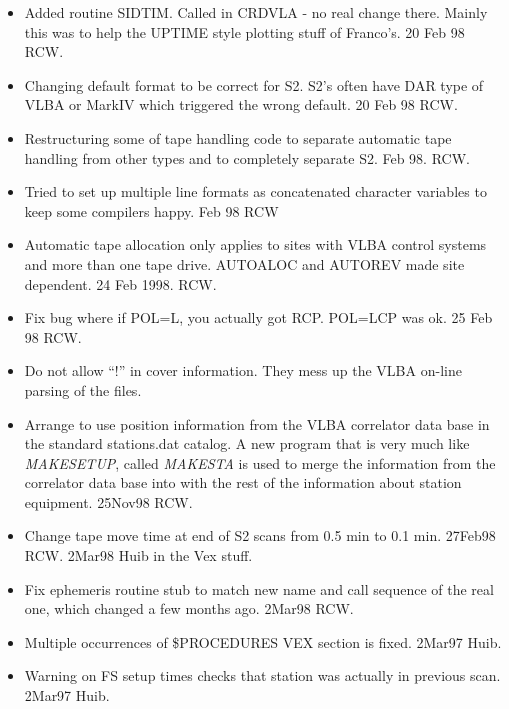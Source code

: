 \documentclass{report}
\begin{document}
\begin{itemize}
\item Added routine SIDTIM.  Called in CRDVLA - no real change there.
      Mainly this was to help the UPTIME style plotting stuff of
      Franco's.  20 Feb 98  RCW.

\item Changing default format to be correct for S2.  S2's often have
      DAR type of VLBA or MarkIV which triggered the wrong default.
      20 Feb 98  RCW.

\item Restructuring some of tape handling code to separate automatic
      tape handling from other types and to completely separate S2.
      Feb 98.  RCW.

\item Tried to set up multiple line formats as concatenated character
      variables to keep some compilers happy.  Feb 98 RCW

\item Automatic tape allocation only applies to sites with VLBA
      control systems and more than one tape drive.  AUTOALOC and
      AUTOREV made site dependent.  24 Feb 1998. RCW.

\item Fix bug where if POL=L, you actually got RCP.  POL=LCP was ok.
      25 Feb 98  RCW.

\item Do not allow ``!'' in cover information.  They mess up the
      VLBA on-line parsing of the files.

\item Arrange to use position information from the VLBA correlator
      data base in the standard stations.dat catalog.  A new program
      that is very much like {\sl MAKESETUP}, called {\sl MAKESTA}
      is used to merge the information from the correlator data
      base into with the rest of the information about station
      equipment.  25Nov98  RCW.

\item Change tape move time at end of S2 scans from 0.5 min to 0.1 min.
      27Feb98 RCW.  2Mar98 Huib in the Vex stuff.

\item Fix ephemeris routine stub to match new name and call sequence
      of the real one, which changed a few months ago.  2Mar98 RCW.

\item Multiple occurrences of \$PROCEDURES VEX section is fixed.
      2Mar97 Huib.

\item Warning on FS setup times checks that station was actually in
      previous scan.   2Mar97 Huib.


\end{itemize}
\end{document}
